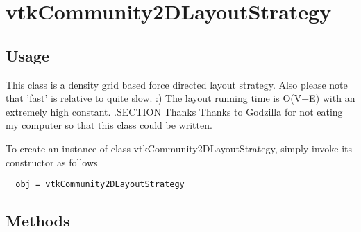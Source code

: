 \section{vtkCommunity2DLayoutStrategy}

\subsection{Usage}

 This class is a density grid based force directed layout strategy.
 Also please note that 'fast' is relative to quite slow. :)
 The layout running time is O(V+E) with an extremely high constant.
 .SECTION Thanks
 Thanks to Godzilla for not eating my computer so that this class
 could be written.

To create an instance of class vtkCommunity2DLayoutStrategy, simply
invoke its constructor as follows
\begin{verbatim}
  obj = vtkCommunity2DLayoutStrategy
\end{verbatim}
\subsection{Methods}

